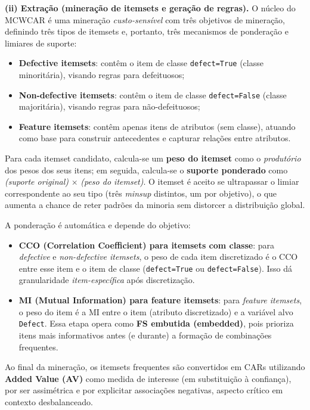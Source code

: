 \textbf{(ii) Extração (mineração de itemsets e geração de regras).}
O núcleo do MCWCAR é uma mineração \textit{custo-sensível} com três objetivos de mineração, definindo três tipos de itemsets e, portanto, três mecanismos de ponderação e limiares de suporte:
\begin{itemize}
    \item \textbf{Defective itemsets}: contêm o item de classe \texttt{defect=True} (classe minoritária), visando regras para defeituosos;
    \item \textbf{Non-defective itemsets}: contêm o item de classe \texttt{defect=False} (classe majoritária), visando regras para não-defeituosos;
    \item \textbf{Feature itemsets}: contêm apenas itens de atributos (sem classe), atuando como base para construir antecedentes e capturar relações entre atributos.
\end{itemize}

Para cada itemset candidato, calcula-se um \textbf{peso do itemset} como o \textit{produtório} dos pesos dos seus itens; em seguida, calcula-se o \textbf{suporte ponderado} como \textit{(suporte original)} $\times$ \textit{(peso do itemset)}. O itemset é aceito se ultrapassar o limiar correspondente ao seu tipo (três \textit{minsup} distintos, um por objetivo), o que aumenta a chance de reter padrões da minoria sem distorcer a distribuição global.

A ponderação é automática e depende do objetivo:
\begin{itemize}
    \item \textbf{CCO (Correlation Coefficient) para itemsets com classe}: para \textit{defective} e \textit{non-defective itemsets}, o peso de cada item discretizado é o CCO entre esse item e o item de classe (\texttt{defect=True} ou \texttt{defect=False}). Isso dá granularidade \textit{item-específica} após discretização.
    \item \textbf{MI (Mutual Information) para feature itemsets}: para \textit{feature itemsets}, o peso do item é a MI entre o item (atributo discretizado) e a variável alvo \texttt{Defect}. Essa etapa opera como \textbf{FS embutida (embedded)}, pois prioriza itens mais informativos antes (e durante) a formação de combinações frequentes.
\end{itemize}

Ao final da mineração, os itemsets frequentes são convertidos em CARs utilizando \textbf{Added Value (AV)} como medida de interesse (em substituição à confiança), por ser assimétrica e por explicitar associações negativas, aspecto crítico em contexto desbalanceado.

